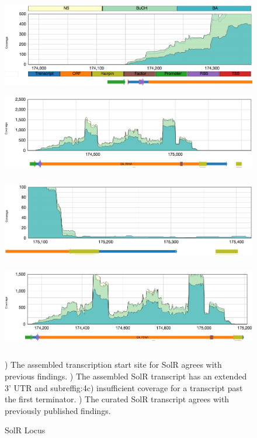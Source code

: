 \begin{figure}
{\includegraphics[width=\textwidth,height=1.5in]{images/Assembly/Examples/Sol/SolR-TSS.png}
\label{fig:4a}}
{\includegraphics[width=\textwidth,height=1.5in]{images/Assembly/Examples/Sol/SolR-transcript.png}
\label{fig:4b}}
{\includegraphics[width=\textwidth,height=1.5in]{images/Assembly/Examples/Sol/SolR-termination.png}
\label{fig:4c}}
{\includegraphics[width=\textwidth,height=1.5in]{images/Assembly/Examples/Sol/SolR-curated.png}
\label{fig:4d}}
\caption{SolR Locus}
) The assembled transcription start site for SolR agrees with previous findings. ) The assembled SolR transcript has an extended 3' UTR and subref{fig:4c}) insufficient coverage for a transcript past the first terminator. ) The curated SolR transcript agrees with previously published findings\cite{69}.
\end{figure}

